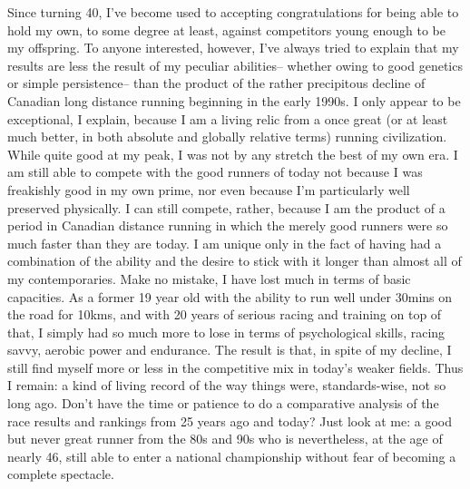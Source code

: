 Since turning 40, I've become used to accepting congratulations for being able to hold my own, to some degree at least, against competitors young enough to be my offspring. To anyone interested, however, I've always tried to explain that my results are less the result of my peculiar abilities-- whether owing to good genetics or simple persistence-- than the product of the rather precipitous decline of Canadian long distance running beginning in the early 1990s. I only appear to be exceptional, I explain, because I am a living relic from a once great (or at least much better, in both absolute and globally relative terms) running civilization. While quite good at my peak, I was not by any stretch the best of my own era. I am still able to compete with the good runners of today not because I was freakishly good in my own prime, nor even because I'm particularly well preserved physically. I can still compete, rather, because I am the product of a period in Canadian distance running in which the merely good runners were so much faster than they are today. I am unique only in the fact of having had a combination of the ability and the desire to stick with it longer than almost all of my contemporaries. Make no mistake, I have lost much in terms of basic capacities. As a former 19 year old with the ability to run well under 30mins on the road for 10kms, and with 20 years of serious racing and training on top of that, I simply had so much more to lose in terms of psychological skills, racing savvy, aerobic power and endurance. The result is that, in spite of my decline, I still find myself more or less in the competitive mix in today's weaker fields. Thus I remain: a kind of living record of the way things were, standards-wise, not so long ago. Don't have the time or patience to do a comparative analysis of the race results and rankings from 25 years ago and today? Just look at me: a good but never great runner from the 80s and 90s who is nevertheless, at the age of nearly 46, still able to enter a national championship without fear of becoming a complete spectacle.

